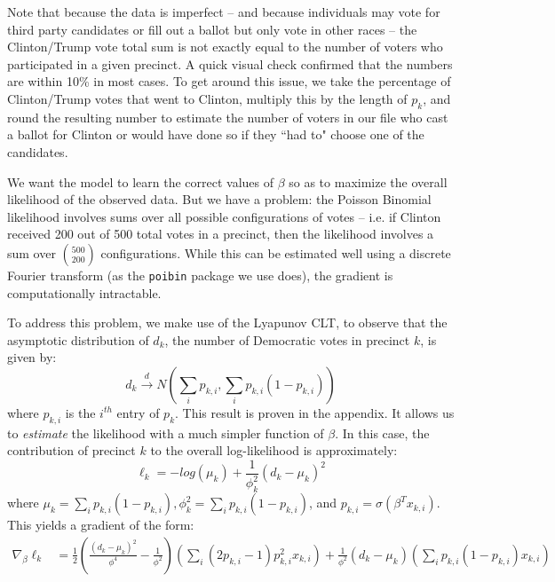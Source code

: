 \documentclass{article}
\begin{document}
Note that because the data is imperfect -- and because individuals may vote for third party candidates or fill out a ballot but only vote in other races -- the Clinton/Trump vote total sum is not exactly equal to the number of voters who participated in a given precinct. A quick visual check confirmed that the numbers are within 10\% in most cases. To get around this issue, we take the percentage of Clinton/Trump votes that went to Clinton, multiply this by the length of $p_k$, and round the resulting number to estimate the number of voters in our file who cast a ballot for Clinton or would have done so if they ``had to" choose one of the candidates. 

We want the model to learn the correct values of $\beta$ so as to maximize the overall likelihood of the observed data. But we have a problem: the Poisson Binomial likelihood involves sums over all possible configurations of votes -- i.e. if Clinton received 200 out of 500 total votes in a precinct, then the likelihood involves a sum over $500 \choose 200$ configurations. While this can be estimated well using a discrete Fourier transform (as the \texttt{poibin} package we use does), the gradient is computationally intractable. 

To address this problem, we make use of the Lyapunov CLT, to observe that the asymptotic distribution of $d_k$, the number of Democratic votes in precinct $k$, is given by: 
\[ d_k \stackrel{d} \longrightarrow N \left(\sum_{i} p_{k,i}, \sum_{i} p_{k, i}(1-p_{k, i}) \right) \] 
where $p_{k, i}$ is the $i^{th}$ entry of $p_k$. This result is proven in the appendix. It allows us to \emph{estimate} the likelihood with a much simpler function of $\beta$. In this case, the contribution of precinct $k$ to the overall log-likelihood is approximately: 
\[ \ell_k = -log \left( \mu_k\right) + \frac{1}{\phi_k^2} \left( d_k -\mu_k \right)^2  \] 
where $\mu_k =  \sum_{i} p_{k, i}(1-p_{k, i}), \phi_k^2 = \sum_{i} p_{k, i}(1-p_{k, i})$, and $p_{k, i} = \sigma(\beta^T x_{k, i})$. This yields a gradient of the form: 
\begin{align*}
\nabla_{\beta} \ell_k &=  \frac{1}{2} \left(\frac{(d_k - \mu_k)^2}{\phi^4} - \frac{1}{\phi^2} \right) \left( \sum_{i} (2 p_{k, i} - 1)p_{k, i}^2 x_{k, i} \right) + \frac{1}{\phi^2} (d_k - \mu_k) \left( \sum_i p_{k, i} (1 - p_{k, i}) x_{k, i} \right)
\end{align*}
\end{document}

